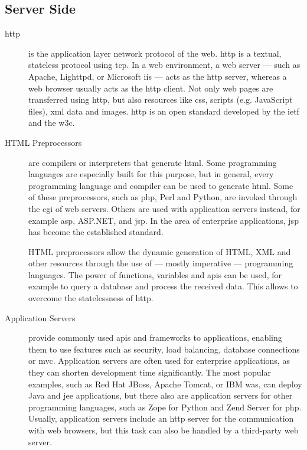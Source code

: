 \subsection{Server Side}
\begin{description}
	\item[\gls{http}] is the application layer network protocol of the web. \gls{http} is a textual, stateless protocol using \acs{tcp}. In a web environment, a web server --- such as Apache, Lighttpd, or Microsoft \gls{iis} --- acts as the \gls{http} server, whereas a web browser usually acts as the \gls{http} client. Not only web pages are transferred using \gls{http}, but also resources like \ac{css}, scripts (e.g. JavaScript files), \gls{xml} data and images. \gls{http} is an open standard developed by the \gls{ietf} and the \gls{w3c}.
	\item[HTML Preprocessors] are compilers or interpreters that generate \gls{html}. Some programming languages are especially built for this purpose, but in general, every programming language and compiler can be used to generate \gls{html}. Some of these preprocessors, such as \acs{php}, Perl and Python, are invoked through the \gls{cgi} of web servers. Others are used with application servers instead, for example \gls{asp}, ASP.NET, and \gls{jsp}. In the area of enterprise applications, \gls{jsp} has become the established standard.

	HTML preprocessors allow the dynamic generation of HTML, XML and other resources through the use of --- mostly imperative --- programming languages. The power of functions, variables and \glspl{api} can be used, for example to query a database and process the received data. This allows to overcome the statelessness of \gls{http}.
	\item[Application Servers] provide commonly used \glspl{api} and frameworks to applications, enabling them to use features such as security, load balancing, database connections or \gls{mvc}. Application servers are often used for enterprise applications, as they can shorten development time significantly. The most popular examples, such as Red Hat JBoss, Apache Tomcat, or IBM \gls{was}, can deploy Java and \acs{jee} applications, but there also are application servers for other programming languages, such as Zope for Python and Zend Server for \gls{php}. Usually, application servers include an \gls{http} server for the communication with web browsers, but this task can also be handled by a third-party web server.


\end{description}
